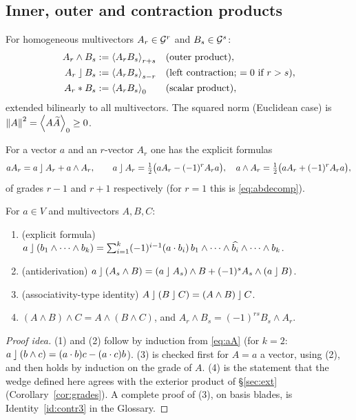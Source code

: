 \subsection{Inner, outer and contraction products}

\begin{definition}\label{def:products}
For homogeneous multivectors $A_r\in\mathcal{G}^r$ and $B_s\in\mathcal{G}^s$:
\begin{align*}
 A_r\wedge B_s&:=\left\langle A_rB_s \right\rangle_{r+s}&&\text{(outer product)},\\
 A_r\mathbin{\rfloor} B_s&:=\left\langle A_rB_s \right\rangle_{s-r}&&\text{(left contraction; $=0$ if $r>s$)},\\
 A_r*B_s&:=\left\langle A_rB_s \right\rangle_{0}&&\text{(scalar product)},
\end{align*}
extended bilinearly to all multivectors. The squared norm (Euclidean case) is $\left\lVert A\right\rVert^2=\left\langle A\widetilde{A} \right\rangle_{0}\ge0$.
\end{definition}

For a vector $a$ and an $r$-vector $A_r$ one has the explicit formulas
\begin{equation}\label{eq:aA}
 aA_r=a\lc A_r+a\wedge A_r,\qquad
 a\lc A_r=\tfrac12\bigl(aA_r-(-1)^rA_ra\bigr),\quad
 a\wedge A_r=\tfrac12\bigl(aA_r+(-1)^rA_ra\bigr),
\end{equation}
of grades $r-1$ and $r+1$ respectively (for $r=1$ this is \eqref{eq:abdecomp}).

\begin{proposition}[Properties]\label{prop:contr}
For $a\in V$ and multivectors $A,B,C$:
\begin{enumerate}
  \item (explicit formula) $a\mathbin{\rfloor}(b_1\wedge\cdots\wedge b_k)=\sum_{i=1}^k(-1)^{i-1}(a\cdot b_i)\,b_1\wedge\cdots\wedge\widehat{b_i}\wedge\cdots\wedge b_k$.
  \item (antiderivation) $a\mathbin{\rfloor}(A_s\wedge B)=(a\mathbin{\rfloor} A_s)\wedge B+(-1)^sA_s\wedge(a\mathbin{\rfloor} B)$.
  \item (associativity-type identity) $A\mathbin{\rfloor}(B\mathbin{\rfloor} C)=(A\wedge B)\mathbin{\rfloor} C$.
  \item $(A\wedge B)\wedge C=A\wedge(B\wedge C)$, and $A_r\wedge B_s=(-1)^{rs}B_s\wedge A_r$.
\end{enumerate}
\end{proposition}
\begin{proof}[Proof idea]
(1) and (2) follow by induction from \eqref{eq:aA} (for $k=2$: $a\mathbin{\rfloor}(b\wedge c)=(a\cdot b)c-(a\cdot c)b$). (3) is checked first for $A=a$ a vector, using (2), and then holds by induction on the grade of $A$. (4) is the statement that the wedge defined here agrees with the exterior product of \S\ref{sec:ext} (Corollary~\ref{cor:grades}).
A complete proof of (3), on basis blades, is Identity~\ref{id:contr3} in the Glossary.%
\end{proof}

